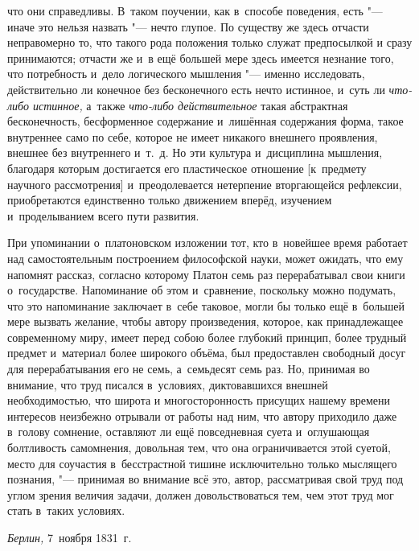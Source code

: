 что они справедливы. В~таком поучении, как в~способе поведения, есть
"--- иначе это нельзя назвать "--- нечто глупое. По существу же здесь
отчасти неправомерно то, что такого рода положения только служат предпосылкой
и сразу принимаются; отчасти же и~в ещё большей мере здесь имеется
незнание того, что потребность и~дело логического мышления "--- именно
исследовать, действительно ли конечное без бесконечного есть нечто
истинное, и~суть ли {\em что-либо истинное,} а~также
{\em что-либо действительное} такая абстрактная бесконечность, бесформенное
содержание и~лишённая содержания форма, такое внутреннее само по себе, которое не
имеет никакого внешнего проявления, внешнее без внутреннего и~т.~д. Но эти культура и~дисциплина
мышления, благодаря которым достигается его пластическое отношение [к~предмету
научного рассмотрения] и~преодолевается нетерпение вторгающейся рефлексии,
приобретаются единственно только движением вперёд, изучением и~проделыванием
всего пути развития.

При упоминании о~платоновском изложении тот, кто в~новейшее время работает над
самостоятельным построением философской науки, может ожидать, что ему напомнят
рассказ, согласно которому Платон семь раз перерабатывал свои книги
о~государстве. Напоминание об этом и~сравнение, поскольку можно подумать, что
это напоминание заключает в~себе таковое, могли бы только ещё в~большей мере
вызвать желание, чтобы автору произведения, которое, как принадлежащее
современному миру, имеет перед собою более глубокий принцип, более трудный
предмет и~материал более широкого объёма, был предоставлен свободный досуг для
перерабатывания его не семь, а~семьдесят семь раз. Но, принимая во внимание,
что труд писался в~условиях, диктовавшихся внешней необходимостью, что широта и
многосторонность присущих нашему времени интересов неизбежно отрывали от работы над ним,
что автору приходило даже в~голову сомнение, оставляют ли ещё повседневная
суета и~оглушающая болтливость самомнения, довольная тем, что она
ограничивается этой суетой, место для соучастия в~бесстрастной
тишине исключительно только мыслящего познания, "--- принимая во внимание
всё это, автор, рассматривая свой труд под углом зрения величия задачи, должен
довольствоваться тем, чем этот труд мог стать в~таких условиях.

{\em Берлин,} 7~ноября 1831~г.

\bigskip
